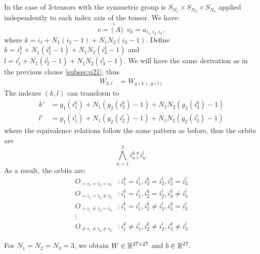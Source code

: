 \documentclass[english]{article}
\begin{document}
\subsection{~}

In the case of 3-tensors with the symmetric group is $S_{N_1}\times S_{N_2}\times S_{N_3}$
applied independently to each index axis of the tensor. We have: 
\begin{equation}
v=\vec(A) \,\,\,   v_k=a_{i_1,i_2,i_3}
,
\end{equation}
where $k=i_1+N_1(i_2-1)+N_1N_2(i_3-1)$. Define $k=i_1^{k}+N_1(i_2^{k}-1)+N_1N_2(i_3^{k}-1)$
and $l=i_1^{l}+N_1(i_2^{l}-1)+N_1N_2(i_3^{l}-1)$. We will
have the same derivation as in the previous clause \ref{subsec:q21},
thus 
\begin{align}
W_{k,l} & =W_{g(k),g(l)}
\end{align}
The indexes $\left(k,l\right)$ can transform to 
\begin{align}
k' & =g_1(i_1^{k})+N_1(g_2(i_2^{k})-1)+N_1N_2(g_3(i_3^{k})-1)\\
l' & =g_1(i_1^{l})+N_1(g_2(i_2^{l})-1)+N_1N_2(g_3(i_3^{l})-1)
\end{align}
where the equivalence relations follow the same pattern as before,
thus the orbits are 
\begin{equation}
\bigwedge_{n=1}^{3} i_n^{k}{}_{=}^{\neq}i_n^{l}
.    
\end{equation}
As a result, the orbits are:
\begin{align*}
O_{=i_1=i_2=i_3} & :i_1^{k}=i_1^{l},i_2^{k}=i_2^{l},i_3^{k}=i_3^{l}\\
O_{=i_1=i_2\neq i_3} & :i_1^{k}=i_1^{l},i_2^{k}=i_2^{l},i_3^{k}\neq i_3^{l}\\
O_{=i_1\neq i_2=i_3} & :i_1^{k}=i_1^{l},i_2^{k}\neq i_2^{l},i_3^{k}=i_3^{l}\\
\vdots &\\
O_{\neq i_1 \neq i_2\neq i_3} & :i_1^{k}\neq i_1^{l},i_2^{k}\neq i_2^{l},i_3^{k}\neq i_3^{l}
\end{align*}

For $N_1=N_2=N_3=3$, we obtain $W\in\mathbb{R}^{27\times27}$ and $b\in\mathbb{R}^{27}$.
\end{document}
